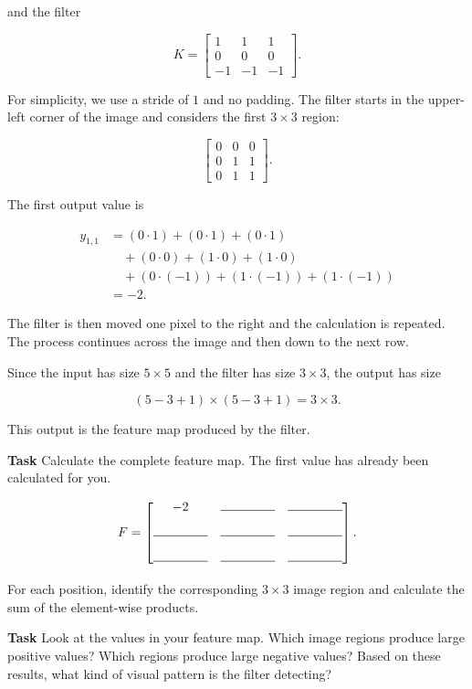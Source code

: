 \documentclass{course_sheet}
\begin{document}
and the filter

\[
K =
\begin{bmatrix}
1 & 1 & 1\\
0 & 0 & 0\\
-1 & -1 & -1
\end{bmatrix}.
\]

For simplicity, we use a stride of $1$ and no padding. The filter starts in the upper-left corner of the image and considers the first $3 \times 3$ region:

\[
\begin{bmatrix}
0 & 0 & 0\\
0 & 1 & 1\\
0 & 1 & 1
\end{bmatrix}.
\]

The first output value is

\[
\begin{aligned}
y_{1,1}
&=(0\cdot1)+(0\cdot1)+(0\cdot1)\\
&\quad +(0\cdot0)+(1\cdot0)+(1\cdot0)\\
&\quad +(0\cdot(-1))+(1\cdot(-1))+(1\cdot(-1))\\
&=-2.
\end{aligned}
\]

The filter is then moved one pixel to the right and the calculation is repeated. The process continues across the image and then down to the next row.

Since the input has size $5 \times 5$ and the filter has size $3 \times 3$, the output has size

\[
(5-3+1) \times (5-3+1)=3 \times 3.
\]

This output is the feature map produced by the filter.

\textbf{Task} Calculate the complete feature map. The first value has already been calculated for you.

\[
F =
\begin{bmatrix}
-2 & \rule{1.5cm}{0.15mm} & \rule{1.5cm}{0.15mm}\\[0.8em]
\rule{1.5cm}{0.15mm} & \rule{1.5cm}{0.15mm} & \rule{1.5cm}{0.15mm}\\[0.8em]
\rule{1.5cm}{0.15mm} & \rule{1.5cm}{0.15mm} & \rule{1.5cm}{0.15mm}
\end{bmatrix}.
\]

For each position, identify the corresponding $3 \times 3$ image region and calculate the sum of the element-wise products.

\textbf{Task} Look at the values in your feature map. Which image regions produce large positive values? Which regions produce large negative values? Based on these results, what kind of visual pattern is the filter detecting?
\end{document}
